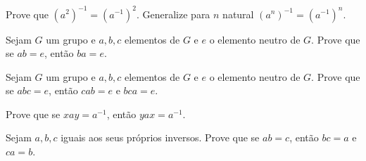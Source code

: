 \begin{exercise}
	Prove que $(a^2)^{-1} = (a^{-1})^2$. Generalize para $n$ natural $(a^n)^{-1} = (a^{-1})^n$.
\end{exercise}

\begin{exercise}
	Sejam $G$ um grupo e $a, b, c$ elementos de $G$ e $e$ o elemento neutro de $G$. Prove que se $ab = e$, então $ba = e$.
\end{exercise}

\begin{exercise}
	Sejam $G$ um grupo e $a, b, c$ elementos de $G$ e $e$ o elemento neutro de $G$. Prove que se $abc = e$, então $cab = e$ e $bca = e$.
\end{exercise}

\begin{exercise}
	Prove que se $xay = a^{-1}$, então $yax = a^{-1}$.
\end{exercise}

\begin{exercise}
	Sejam $a, b, c$ iguais aos seus próprios inversos. Prove que se $ab = c$, então $bc = a$ e $ca = b$.
\end{exercise}
